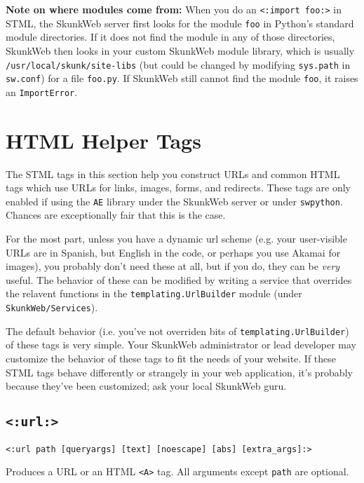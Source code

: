 \documentclass{manual}
\begin{document}
\textbf{Note on where modules come from:} When you do an
\texttt{<:import foo:>} in STML, the SkunkWeb server first looks for
the module \texttt{foo} in Python's standard module directories. If it
does not find the module in any of those directories, SkunkWeb then
looks in your custom SkunkWeb module library, which is usually
\texttt{/usr/local/skunk/site-libs} (but could be changed by 
modifying \texttt{sys.path} in \texttt{sw.conf})
for a file \texttt{foo.py}.
If SkunkWeb still cannot find the module \texttt{foo}, it raises an 
\texttt{ImportError}.



\chapter{HTML Helper Tags}
\label{stmlrefurl}

The STML tags in this section help you construct URLs and common HTML
tags which use URLs for links, images, forms, and redirects.  These
tags are only enabled if using the \texttt{AE} library under the
SkunkWeb server or under \texttt{swpython}.  Chances are exceptionally
fair that this is the case.

For the most part, unless you have a dynamic url scheme (e.g. your
user-visible URLs are in Spanish, but English in the code, or perhaps
you use Akamai for images), you probably don't need these at all, but
if you do, they can be \emph{very} useful.  The behavior of these can
be modified by writing a service that overrides the relavent functions
in the \texttt{templating.UrlBuilder} module (under
\texttt{SkunkWeb/Services}).

The default behavior (i.e. you've not overriden bits of
\texttt{templating.UrlBuilder}) of these tags is very simple.  Your
SkunkWeb administrator or lead developer may customize the behavior of
these tags to fit the needs of your website.  If these STML tags
behave differently or strangely in your web application, it's probably
because they've been customized; ask your local SkunkWeb guru.

\section{\texttt{<:url:>}}
\label{tagurl}

\begin{verbatim}<:url path [queryargs] [text] [noescape] [abs] [extra_args]:>\end{verbatim}

Produces a URL or an HTML \texttt{<A>} tag. 
All arguments except \texttt{path} are optional.
\end{document}
